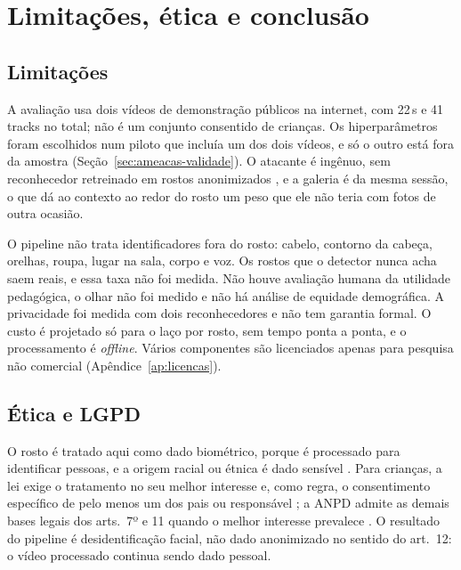 \chapter{Limitações, ética e conclusão}
\label{cap:conclusao}


\section{Limitações}

A avaliação usa dois vídeos de demonstração públicos na internet, com 22\,s e 41 tracks no total; não é um conjunto consentido de crianças. Os hiperparâmetros foram escolhidos num piloto que incluía um dos dois vídeos, e só o outro está fora da amostra (Seção~\ref{sec:ameacas-validade}). O atacante é ingênuo, sem reconhecedor retreinado em rostos anonimizados \citep{hanisch}, e a galeria é da mesma sessão, o que dá ao contexto ao redor do rosto um peso que ele não teria com fotos de outra ocasião.

O pipeline não trata identificadores fora do rosto: cabelo, contorno da cabeça, orelhas, roupa, lugar na sala, corpo e voz. Os rostos que o detector nunca acha saem reais, e essa taxa não foi medida. Não houve avaliação humana da utilidade pedagógica, o olhar não foi medido e não há análise de equidade demográfica. A privacidade foi medida com dois reconhecedores e não tem garantia formal. O custo é projetado só para o laço por rosto, sem tempo ponta a ponta, e o processamento é \emph{offline}. Vários componentes são licenciados apenas para pesquisa não comercial (Apêndice~\ref{ap:licencas}).

\section{Ética e LGPD}

O rosto é tratado aqui como dado biométrico, porque é processado para identificar pessoas, e a origem racial ou étnica é dado sensível \citep[art.~5, II; art.~11]{lgpd}. Para crianças, a lei exige o tratamento no seu melhor interesse e, como regra, o consentimento específico de pelo menos um dos pais ou responsável \citep[art.~14, §1]{lgpd}; a ANPD admite as demais bases legais dos arts.~7º e 11 quando o melhor interesse prevalece \citep{anpd2023}. O resultado do pipeline é desidentificação facial, não dado anonimizado no sentido do art.~12: o vídeo processado continua sendo dado pessoal.

